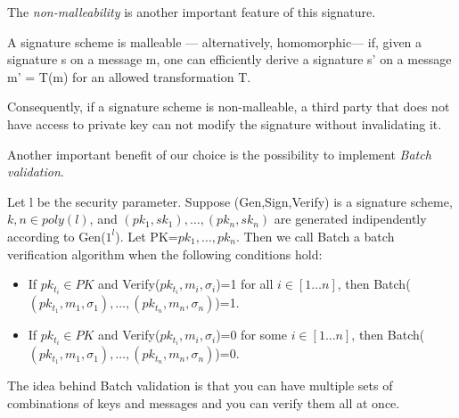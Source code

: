 
The \textit{non-malleability} is another important feature of this signature.

\begin{teorema}
	A signature scheme is malleable — alternatively, homomorphic— if, given a signature s on a message m, one can efficiently derive a signature s' on a message m' = T(m) for an allowed transformation T.
\end{teorema}

Consequently, if a signature scheme is non-malleable, a third party that does not have access to private key can not modify the signature without invalidating it.

Another important benefit of our choice is the possibility to implement \textit{Batch validation}.
\begin{teorema}
	Let l be the security parameter. Suppose (Gen,Sign,Verify) is a signature scheme, $k, n \in poly(l)$, and $(pk_{1},sk_{1}), \dots, (pk_{n},sk_{n})$ are generated indipendently according to Gen($1^{l}$). Let PK=${pk_{1},\dots,pk_{n}}$. Then we call Batch a batch verification algorithm when the following conditions hold:
	\begin{itemize}
		\item If $pk_{t_{i}} \in PK$ and Verify($pk_{t_{i}},m_{i},\sigma_{i}$)=1 for all $i \in [1 \dots n]$, then Batch($(pk_{t_{1}},m_{1},\sigma_{1}),\dots, (pk_{t_{n}},m_{n},\sigma_{n})$)=1.
		\item If $pk_{t_{i}} \in PK$ and Verify($pk_{t_{i}},m_{i},\sigma_{i}$)=0 for some $i \in [1 \dots n]$, then Batch($(pk_{t_{1}},m_{1},\sigma_{1}),\dots, (pk_{t_{n}},m_{n},\sigma_{n})$)=0.
	\end{itemize}
\end{teorema}
The idea behind Batch validation is that you can have multiple sets of combinations of keys and messages and you can verify them all at once.




\noindent 
